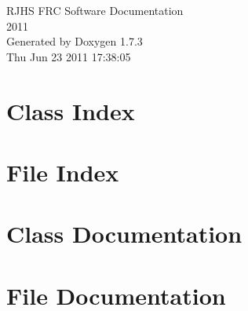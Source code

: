 \documentclass[letterpaper]{book}
\begin{document}
\hypersetup{pageanchor=false}
\begin{titlepage}
\vspace*{7cm}
\begin{center}
{\Large RJHS FRC Software Documentation \\[1ex]\large 2011 }\\
\vspace*{1cm}
{\large Generated by Doxygen 1.7.3}\\
\vspace*{0.5cm}
{\small Thu Jun 23 2011 17:38:05}\\
\end{center}
\end{titlepage}
\clearemptydoublepage
{}
\tableofcontents
\clearemptydoublepage
{}
\hypersetup{pageanchor=true}
\chapter{Class Index}

\chapter{File Index}

\chapter{Class Documentation}






\chapter{File Documentation}














\printindex
\end{document}
